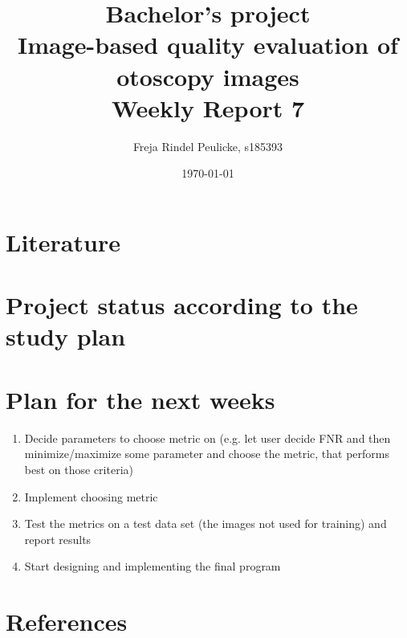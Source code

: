 \documentclass[10pt,a4paper]{article}
\title{{Bachelor's project\\[0.5em]}
       {\bf \huge Image-based quality evaluation of otoscopy images\\[0.5em]}
       {\bf Weekly Report 7}}
\author{Freja Rindel Peulicke, s185393}
\date{\today}
\begin{document}
\maketitle

\section*{Literature}




\newpage
\section*{Project status according to the study plan}




\section*{Plan for the next weeks}

\begin{enumerate}
\item Decide parameters to choose metric on (e.g. let user decide FNR and then minimize/maximize some parameter and choose the metric, that performs best on those criteria)
\item Implement choosing metric
\item Test the metrics on a test data set (the images not used for training) and report results
\item Start designing and implementing the final program
\end{enumerate}



\section*{References}
\printbibliography[type=online,title={Code downloads}]
\printbibliography[type=book,title={Books}]
\printbibliography[type=article,title={Articles}]
\end{document}
